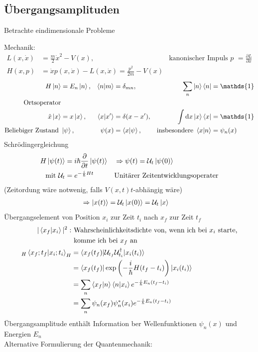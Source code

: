 \subsection{Übergangsamplituden}
Betrachte eindimensionale Probleme

Mechanik:
	\begin{align*}
		L(x,\dot{x}) &= 
		\frac{m}{2} \dot{x}^2 - V(x),&
		\text{kanonischer Impuls } p&= \frac{\partial L}{\partial \dot{x}}\\
		H(x,p) &= \dot{x}p(x,\dot{x}) - L(x, \dot{x}) = \frac{p^2}{2m} - V(x)
	\end{align*}
	\begin{align*}
		H\ket{n} &= E_n \ket{n} ,& 
		\braket{n | m} &= \delta_{mn} ,& 
		\sum_n \ket{n} \bra{n} &= \mathds{1} \\
		\text{Ortsoperator} \\
		\hat{x} \ket{x} &= x \ket{x} ,&
		\braket{x | x'} &= \delta(x - x') ,&
		\int \diff x \ket{x} \bra{x} &= \mathds{1} \\
		\text{Beliebiger Zustand }
		&\ket{\psi} ,&
		\psi(x) &= \braket{x | \psi} ,&
		\text{insbesondere } \braket{x | n} &= \psi_n(x)
	\end{align*}
Schrödingergleichung
	\begin{align*}
		H \ket{\psi(t)} &= i \hbar \frac{\partial}{\partial t} \ket{\psi(t)}
		& &\Rightarrow \psi(t) = \mathcal{U}_t \ket{\psi(0)} \\
		\text{mit } \mathcal{U}_t &= e^{-\frac{i}{\hbar} H t} & &\text{Unitärer Zeitentwicklungsoperater}
	\end{align*}
(Zeitordung wäre notwenig, falls $V(x,t) t$-abhängig wäre)
	\begin{align*}
		\Rightarrow \ket{x(t)} &= \mathcal{U}_t \ket{x(0)} = \mathcal{U}_t \ket{x} 
	\end{align*}
Übergangselement von Position $x_i$ zur Zeit $t_i$ nach $x_f$ zur Zeit $t_f$ 
	\begin{align*}
		|\braket{x_f | x_i}|^2 :& \text{ Wahrscheinlichkeitsdichte von, wenn ich bei }x_i\text{ starte,}\\ &\text{ komme ich bei }x_f\text{ an} \\
		_H\braket{x_f;t_f | x_i; t_i}_H &=
		\braket{x_f(t_f) | \mathcal{U}_{t_f} \mathcal{U}_{t_i}^\dagger | x_i(t_i)} \\
		&= \braket{x_f(t_f) | \exp \left(-\frac{i}{\hbar} H(t_f-t_i)\right) | x_i(t_i)}\\
		&= \sum_n \braket{x_f | n} \braket{n | x_i} e^{-\frac{i}{\hbar} E_n (t_f - t_i)} \\
		&= \sum_n \psi_n (x_f) \psi^*_n(x_i) e^{-\frac{i}{\hbar} E_n (t_f - t_i)}
	\end{align*}
Übergangsamplitude enthält Information ber Wellenfunktionen $\psi_n(x)$ und Energien $E_n$ 
\\
Alternative Formulierung der Quantenmechanik:

